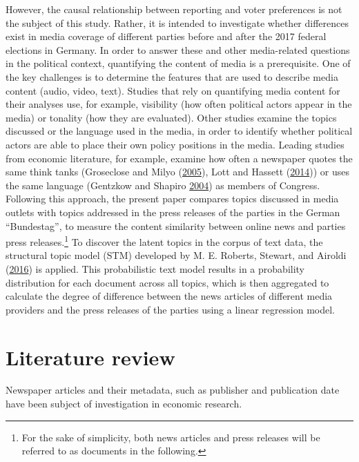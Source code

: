 \documentclass[
]{article}
\begin{document}
However, the causal relationship between reporting and voter preferences
is not the subject of this study. Rather, it is intended to investigate
whether differences exist in media coverage of different parties before
and after the 2017 federal elections in Germany. In order to answer
these and other media-related questions in the political context,
quantifying the content of media is a prerequisite. One of the key
challenges is to determine the features that are used to describe media
content (audio, video, text). Studies that rely on quantifying media
content for their analyses use, for example, visibility (how often
political actors appear in the media) or tonality (how they are
evaluated). Other studies examine the topics discussed or the language
used in the media, in order to identify whether political actors are
able to place their own policy positions in the media. Leading studies
from economic literature, for example, examine how often a newspaper
quotes the same think tanks (Groseclose and Milyo
(\protect\hyperlink{ref-groseclose_measure_2005}{2005}), Lott and
Hassett (\protect\hyperlink{ref-lott_is_2014}{2014})) or uses the same
language (Gentzkow and Shapiro
\protect\hyperlink{ref-gentzkow_media_2004}{2004}) as members of
Congress. Following this approach, the present paper compares topics
discussed in media outlets with topics addressed in the press releases
of the parties in the German ``Bundestag'', to measure the content
similarity between online news and parties press releases.\footnote{For
  the sake of simplicity, both news articles and press releases will be
  referred to as documents in the following.} To discover the latent
topics in the corpus of text data, the structural topic model (STM)
developed by M. E. Roberts, Stewart, and Airoldi
(\protect\hyperlink{ref-roberts_model_2016}{2016}) is applied. This
probabilistic text model results in a probability distribution for each
document across all topics, which is then aggregated to calculate the
degree of difference between the news articles of different media
providers and the press releases of the parties using a linear
regression model.

\hypertarget{literature-review}{%
\section{Literature review}\label{literature-review}}

Newspaper articles and their metadata, such as publisher and publication
date have been subject of investigation in economic research.
\end{document}

